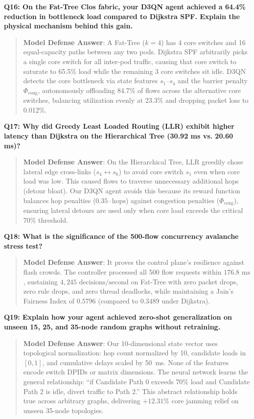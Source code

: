 \noindent\textbf{Q16: On the Fat-Tree Clos fabric, your D3QN agent achieved a 64.4\% reduction in bottleneck load compared to Dijkstra SPF. Explain the physical mechanism behind this gain.}
\begin{quote}
\small
\textbf{Model Defense Answer}: A Fat-Tree ($k=4$) has 4 core switches and 16 equal-capacity paths between any two pods. Dijkstra SPF arbitrarily picks a single core switch for all inter-pod traffic, causing that core switch to saturate to 65.5\% load while the remaining 3 core switches sit idle. D3QN detects the core bottleneck via state features $s_1$--$s_4$ and the barrier penalty $\Phi_{\text{cong}}$, autonomously offloading 84.7\% of flows across the alternative core switches, balancing utilization evenly at 23.3\% and dropping packet loss to 0.012\%.
\end{quote}

\noindent\textbf{Q17: Why did Greedy Least Loaded Routing (LLR) exhibit higher latency than Dijkstra on the Hierarchical Tree (30.92 ms vs. 20.60 ms)?}
\begin{quote}
\small
\textbf{Model Defense Answer}: On the Hierarchical Tree, LLR greedily chose lateral edge cross-links ($s_4 \leftrightarrow s_6$) to avoid core switch $s_1$ even when core load was low. This caused flows to traverse unnecessary additional hops (detour bloat). Our D3QN agent avoids this because its reward function balances hop penalties ($0.35 \cdot \text{hops}$) against congestion penalties ($\Phi_{\text{cong}}$), ensuring lateral detours are used only when core load exceeds the critical 70\% threshold.
\end{quote}

\noindent\textbf{Q18: What is the significance of the 500-flow concurrency avalanche stress test?}
\begin{quote}
\small
\textbf{Model Defense Answer}: It proves the control plane's resilience against flash crowds. The controller processed all 500 flow requests within $176.8\text{ ms}$, sustaining $4,245\text{ decisions/second}$ on Fat-Tree with zero packet drops, zero rule drops, and zero thread deadlocks, while maintaining a Jain's Fairness Index of $0.5796$ (compared to $0.3489$ under Dijkstra).
\end{quote}

\noindent\textbf{Q19: Explain how your agent achieved zero-shot generalization on unseen 15, 25, and 35-node random graphs without retraining.}
\begin{quote}
\small
\textbf{Model Defense Answer}: Our 10-dimensional state vector uses topological normalization: hop count normalized by 10, candidate loads in $[0, 1]$, and cumulative delays scaled by 50~ms. None of the features encode switch DPIDs or matrix dimensions. The neural network learns the general relationship: ``if Candidate Path 0 exceeds 70\% load and Candidate Path 2 is idle, divert traffic to Path 2.'' This abstract relationship holds true across arbitrary graphs, delivering $+12.31\%$ core jamming relief on unseen 35-node topologies.
\end{quote}

